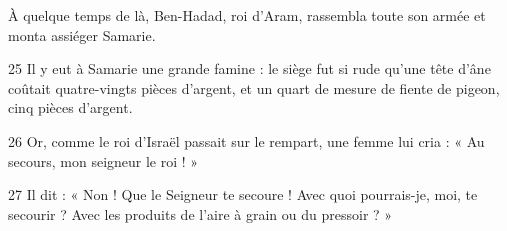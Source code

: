 À quelque temps de là, Ben-Hadad, roi d’Aram, rassembla toute son armée et monta assiéger Samarie.

25 Il y eut à Samarie une grande famine : le siège fut si rude qu’une tête d’âne coûtait quatre-vingts pièces d’argent, et un quart de mesure de fiente de pigeon, cinq pièces d’argent.

26 Or, comme le roi d’Israël passait sur le rempart, une femme lui cria : « Au secours, mon seigneur le roi ! »

27 Il dit : « Non ! Que le Seigneur te secoure ! Avec quoi pourrais-je, moi, te secourir ? Avec les produits de l’aire à grain ou du pressoir ? »
